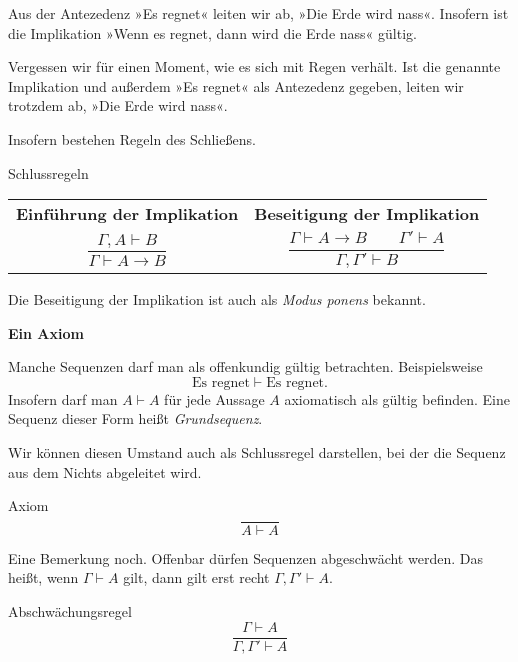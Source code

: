 \documentclass[8pt]{beamer}
\newcommand{\strong}[1]{\textsf{\textbf{#1}}}
\newcommand{\centerheadline}[1]{%
  \begin{center}\strong{#1}\end{center}}
\newcommand{\parspace}{\vspace{0.8em}}
\newcommand{\cond}{\rightarrow}
\begin{document}
\begin{frame}
Aus der Antezedenz »Es regnet« leiten wir ab, »Die Erde wird nass«.
Insofern ist die Implikation »Wenn es regnet, dann wird die Erde
nass« gültig.\pause

\parspace
Vergessen wir für einen Moment, wie es sich mit Regen verhält.
Ist die genannte Implikation und außerdem »Es regnet« als
Antezedenz gegeben, leiten wir trotzdem ab, »Die Erde wird nass«.\pause

\parspace
Insofern bestehen Regeln des Schließens.
\begin{block}{Schlussregeln}
\begin{center}
\begin{tabular}{c@{\qquad\quad}c}
\strong{\small Einführung der Implikation}
& \strong{\small Beseitigung der Implikation}\\[6pt]
$\dfrac{\Gamma,A\vdash B}{\Gamma\vdash A\cond B}$
& $\dfrac{\Gamma\vdash A\cond B\qquad\Gamma'\vdash A}{\Gamma,\Gamma'\vdash B}$\\
\end{tabular}
\end{center}
\end{block}\pause

\parspace
Die Beseitigung der Implikation ist auch als \emph{Modus ponens}
bekannt.
\end{frame}

\begin{frame}
\centerheadline{Ein Axiom}
\end{frame}

\begin{frame}
Manche Sequenzen darf man als offenkundig gültig betrachten. Beispielsweise
\[\text{Es regnet}\vdash\text{Es regnet}.\]\pause
Insofern darf man $A\vdash A$ für jede Aussage $A$
axiomatisch als gültig befinden. Eine Sequenz dieser Form heißt
\emph{Grundsequenz}.\pause

\parspace
Wir können diesen Umstand auch als Schlussregel darstellen, bei der
die Sequenz aus dem Nichts abgeleitet wird.
\begin{block}{Axiom}
\[\dfrac{}{A\vdash A}\]
\end{block}
\end{frame}

\begin{frame}
Eine Bemerkung noch. Offenbar dürfen Sequenzen abgeschwächt werden.
Das heißt, wenn
$\Gamma\vdash A$ gilt, dann gilt erst recht $\Gamma,\Gamma'\vdash A$.\pause
\begin{block}{Abschwächungsregel}
\[\dfrac{\Gamma\vdash A}{\Gamma,\Gamma'\vdash A}\]
\end{block}
\end{frame}
\end{document}
